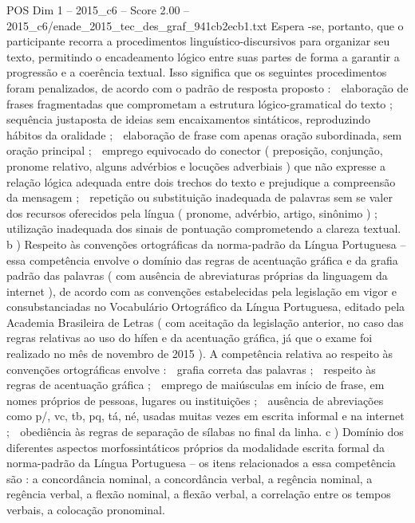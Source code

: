 \begin{textsample}{POS Dim 1 – 2015\_c6 – Score 2.00 – 2015\_c6/enade\_2015\_tec\_des\_graf\_941cb2ecb1.txt}
Espera -se, portanto, que o participante recorra a procedimentos linguístico-discursivos para organizar seu texto, permitindo o encadeamento lógico entre suas partes de forma a garantir a progressão e a coerência textual.
Isso significa que os seguintes procedimentos foram penalizados, de acordo com o padrão de resposta proposto :  elaboração de frases fragmentadas que comprometam a estrutura lógico-gramatical do texto ;  sequência justaposta de ideias sem encaixamentos sintáticos, reproduzindo hábitos da oralidade ;  elaboração de frase com apenas oração subordinada, sem oração principal ;  emprego equivocado do conector ( preposição, conjunção, pronome relativo, alguns advérbios e locuções adverbiais ) que não expresse a relação lógica adequada entre dois trechos do texto e prejudique a compreensão da mensagem ;  repetição ou substituição inadequada de palavras sem se valer dos recursos oferecidos pela língua ( pronome, advérbio, artigo, sinônimo ) ;  utilização inadequada dos sinais de pontuação comprometendo a clareza textual. b ) Respeito às convenções ortográficas da norma-padrão da Língua Portuguesa – essa competência envolve o domínio das regras de acentuação gráfica e da grafia padrão das palavras ( com ausência de abreviaturas próprias da linguagem da internet ), de acordo com as convenções estabelecidas pela legislação em vigor e consubstanciadas no Vocabulário Ortográfico da Língua Portuguesa, editado pela Academia Brasileira de Letras ( com aceitação da legislação anterior, no caso das regras relativas ao uso do hífen e da acentuação gráfica, já que o exame foi realizado no mês de novembro de 2015 ).
A competência relativa ao respeito às convenções ortográficas envolve :  grafia correta das palavras ;  respeito às regras de acentuação gráfica ;  emprego de maiúsculas em início de frase, em nomes próprios de pessoas, lugares ou instituições ;  ausência de abreviações como p/, vc, tb, pq, tá, né, usadas muitas vezes em escrita informal e na internet ;  obediência às regras de separação de sílabas no final da linha. c ) Domínio dos diferentes aspectos morfossintáticos próprios da modalidade escrita formal da norma-padrão da Língua Portuguesa – os itens relacionados a essa competência são : a concordância nominal, a concordância verbal, a regência nominal, a regência verbal, a flexão nominal, a flexão verbal, a correlação entre os tempos verbais, a colocação pronominal.

\end{textsample}
